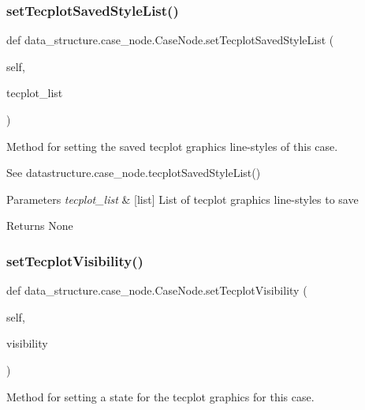 \subsubsection{\texorpdfstring{set\+Tecplot\+Saved\+Style\+List()}{setTecplotSavedStyleList()}}
{\footnotesize\ttfamily def data\+\_\+structure.\+case\+\_\+node.\+Case\+Node.\+set\+Tecplot\+Saved\+Style\+List (\begin{DoxyParamCaption}\item[{}]{self,  }\item[{}]{tecplot\+\_\+list }\end{DoxyParamCaption})}



Method for setting the saved tecplot graphics line-\/styles of this case. 

See datastructure.\+case\+\_\+node.\+tecplot\+Saved\+Style\+List()


\begin{DoxyParams}{Parameters}
{\em tecplot\+\_\+list} & \mbox{[}list\mbox{]} List of tecplot graphics line-\/styles to save \\
\hline
\end{DoxyParams}
\begin{DoxyReturn}{Returns}
None 
\end{DoxyReturn}
\hypertarget{classdata__structure_1_1case__node_1_1_case_node_a7bf258efc68a0aa850fd68d937b54d44}{}\label{classdata__structure_1_1case__node_1_1_case_node_a7bf258efc68a0aa850fd68d937b54d44} 
\subsubsection{\texorpdfstring{set\+Tecplot\+Visibility()}{setTecplotVisibility()}}
{\footnotesize\ttfamily def data\+\_\+structure.\+case\+\_\+node.\+Case\+Node.\+set\+Tecplot\+Visibility (\begin{DoxyParamCaption}\item[{}]{self,  }\item[{}]{visibility }\end{DoxyParamCaption})}



Method for setting a state for the tecplot graphics for this case. 



